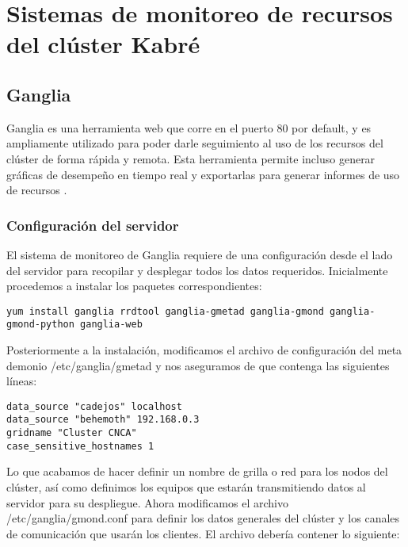 \chapter{Sistemas de monitoreo de recursos del clúster Kabré}

\section{Ganglia}
Ganglia es una herramienta web que corre en el puerto 80 por default, y es ampliamente utilizado para poder darle seguimiento al uso de los recursos del clúster de forma rápida y remota. Esta herramienta permite incluso generar gráficas de desempeño en tiempo real y exportarlas para generar informes de uso de recursos \cite{ganglia}.

\subsection{Configuración del servidor}
El sistema de monitoreo de Ganglia requiere de una configuración desde el lado del servidor para recopilar y desplegar todos los datos requeridos. Inicialmente procedemos a instalar los paquetes correspondientes:

\begin{lstlisting}
yum install ganglia rrdtool ganglia-gmetad ganglia-gmond ganglia-gmond-python ganglia-web
\end{lstlisting}

Posteriormente a la instalación, modificamos el archivo de configuración del meta demonio /etc/ganglia/gmetad y nos aseguramos de que contenga las siguientes líneas:

\begin{lstlisting}
data_source "cadejos" localhost
data_source "behemoth" 192.168.0.3
gridname "Cluster CNCA"
case_sensitive_hostnames 1
\end{lstlisting}

Lo que acabamos de hacer definir un nombre de grilla o red para los nodos del clúster, así como definimos los equipos que estarán transmitiendo datos al servidor para su despliegue. Ahora modificamos el archivo /etc/ganglia/gmond.conf para definir los datos generales del clúster y los canales de comunicación que usarán los clientes. El archivo debería contener lo siguiente:

